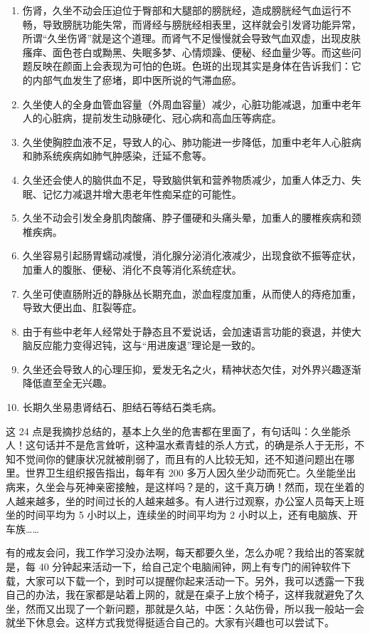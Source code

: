 \documentclass[fontset=founder]{ctexart}
\begin{document}
\begin{enumerate}
    \item 伤肾，久坐不动会压迫位于臀部和大腿部的膀胱经，造成膀胱经气血运行不畅，导致膀胱功能失常，而肾经与膀胱经相表里，这样就会引发肾功能异常，所谓“久坐伤肾”就是这个道理。而肾气不足慢慢就会导致气血双虚，出现皮肤瘙痒、面色苍白或黝黑、失眠多梦、心情烦躁、便秘、经血量少等。而这些问题反映在颜面上会表现为可怕的色斑。色斑的出现其实是身体在告诉我们：它的内部气血发生了瘀堵，即中医所说的气滞血瘀。
    \item 久坐使人的全身血管血容量（外周血容量）减少，心脏功能减退，加重中老年人的心脏病，提前发生动脉硬化、冠心病和高血压等病症。
    \item 久坐使胸腔血液不足，导致人的心、肺功能进一步降低，加重中老年人心脏病和肺系统疾病如肺气肿感染，迁延不愈等。
    \item 久坐还会使人的脑供血不足，导致脑供氧和营养物质减少，加重人体乏力、失眠、记忆力减退并增大患老年性痴呆症的可能性。
    \item 久坐不动会引发全身肌肉酸痛、脖子僵硬和头痛头晕，加重人的腰椎疾病和颈椎疾病。
    \item 久坐容易引起肠胃蠕动减慢，消化腺分泌消化液减少，出现食欲不振等症状，加重人的腹胀、便秘、消化不良等消化系统症状。
    \item 久坐可使直肠附近的静脉丛长期充血，淤血程度加重，从而使人的痔疮加重，导致大便出血、肛裂等症。
    \item 由于有些中老年人经常处于静态且不爱说话，会加速语言功能的衰退，并使大脑反应能力变得迟钝，这与“用进废退”理论是一致的。
    \item 久坐还会导致人的心理压抑，爱发无名之火，精神状态欠佳，对外界兴趣逐渐降低直至全无兴趣。
    \item 长期久坐易患肾结石、胆结石等结石类毛病。
\end{enumerate}

这 24 点是我摘抄总结的，基本上久坐的危害都在里面了，有句话叫：久坐能杀人！这句话并不是危言耸听，这种温水煮青蛙的杀人方式，的确是杀人于无形，不知不觉间你的健康状况就被削弱了，而且有的人比较无知，还不知道问题出在哪里。世界卫生组织报告指出，每年有 200 多万人因久坐少动而死亡。久坐能坐出病来，久坐会与死神亲密接触，是这样吗？是的，这千真万确！然而，现在坐着的人越来越多，坐的时间过长的人越来越多。有人进行过观察，办公室人员每天上班坐的时间平均为 5 小时以上，连续坐的时间平均为 2 小时以上，还有电脑族、开车族……

有的戒友会问，我工作学习没办法啊，每天都要久坐，怎么办呢？我给出的答案就是，每 40 分钟起来活动一下，给自己定个电脑闹钟，网上有专门的闹钟软件下载，大家可以下载一个，到时可以提醒你起来活动一下。另外，我可以透露一下我自己的办法，我在家都是站着上网的，就是在桌子上放个椅子，这样我就避免了久坐，然而又出现了一个新问题，那就是久站，中医：久站伤骨，所以我一般站一会就坐下休息会。这样方式我觉得挺适合自己的。大家有兴趣也可以尝试下。
\end{document}

